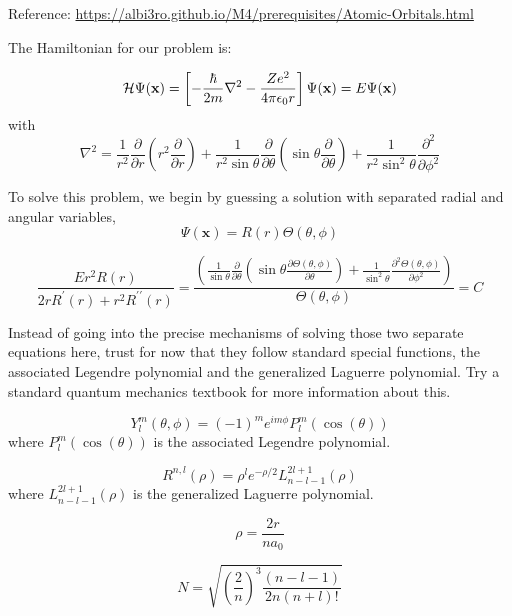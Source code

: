 \documentclass[a4paper]{article}
\begin{document}
Reference: \url{https://albi3ro.github.io/M4/prerequisites/Atomic-Orbitals.html}

The Hamiltonian for our problem is:

\begin{equation} {\cal H}\Psi(\mathbf{x}) =\left[ -\frac{\hbar}{2 m} \nabla^2 - \frac{Z e^2}{4 \pi \epsilon_0 r}\right]\Psi(\mathbf{x}) = E \Psi(\mathbf{x})
\end{equation}
with
\begin{equation} \nabla^2= \frac{1}{r^2}\frac{\partial}{\partial r} \left( r^2 \frac{\partial}{\partial r} \right)+ \frac{1}{r^2 \sin \theta} \frac{\partial}{\partial \theta} \left( \sin \theta \frac{\partial}{\partial \theta} \right)+ \frac{1}{r^2 \sin^2 \theta} \frac{\partial^2}{\partial \phi^2}
\end{equation}

To solve this problem, we begin by guessing a solution with separated radial and angular variables, \begin{equation} \Psi(\mathbf{x}) = R(r) \Theta ( \theta,\phi) \end{equation}

\begin{equation} \frac{E r^2 R(r)}{2r R^{\prime}(r) + r^2 R^{\prime \prime}(r)}= \frac{\left( \frac{1}{\sin \theta} \frac{\partial}{\partial \theta} \left( \sin \theta \frac{\partial \Theta(\theta,\phi)}{\partial \theta} \right)+ \frac{1}{\sin^2 \theta} \frac{\partial^2 \Theta(\theta,\phi)}{\partial \phi^2}\right) }{\Theta( \theta, \phi)} =C \end{equation}

Instead of going into the precise mechanisms of solving those two separate equations here, trust for now that they follow standard special functions, the associated Legendre polynomial and the generalized Laguerre polynomial. Try a standard quantum mechanics textbook for more information about this.

\begin{equation}
Y^m_l(\theta,\phi) = (-1)^m e^{i m \phi} P^m_l (\cos(	\theta))
\end{equation}
where $P^m_l (\cos (\theta))$ is the associated Legendre polynomial.

\begin{equation}
R^{n,l} ( \rho ) = \rho ^l e^{- \rho /2} L^{2 l+1}_{n-l-1} ( \rho )
\end{equation}
where $L^{2 l+1}_{n-l-1}(\rho)$ is the generalized Laguerre polynomial.

\begin{equation}
\rho=\frac{2r}{n a_0}
\end{equation}

\begin{equation}
N=\sqrt{\left(\frac{2}{n}\right)^3 \frac{(n-l-1)}{2n(n+l)!}}
\end{equation}
\end{document}
